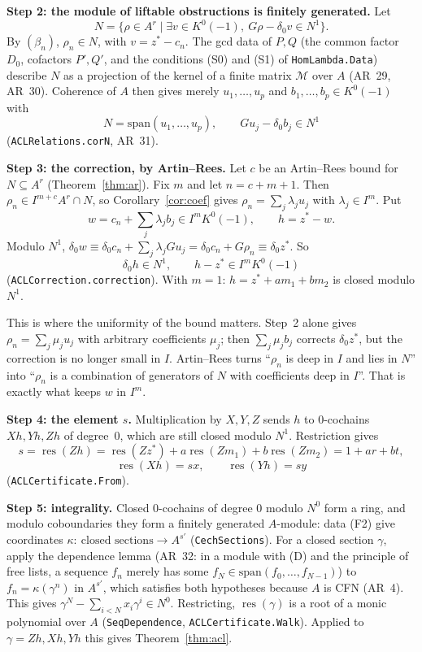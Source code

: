 \documentclass[11pt]{amsart}
\theoremstyle{definition}
\theoremstyle{remark}
\DeclareMathOperator{\res}{res}
\newcommand{\sm}{\mathrm{span}}
\begin{document}
\medskip\noindent\textbf{Step 2: the module of liftable obstructions is
finitely generated.} Let
\[
 N=\{\rho\in A^r\mid \exists v\in K^0(-1),\ G\rho-\delta_0v\in N^1\}.
\]
By $(\beta_n)$, $\rho_n\in N$, with $v=z^*-c_n$. The gcd data of $P,Q$
(the common factor $D_0$, cofactors $P',Q'$, and the conditions (S0) and
(S1) of \texttt{HomLambda.Data}) describe $N$ as a projection of the
kernel of a finite matrix $\mathcal M$ over $A$ (AR~29, AR~30). Coherence of $A$ then gives merely
$u_1,\dots,u_p$ and $b_1,\dots,b_p\in K^0(-1)$ with
\[
 N=\sm(u_1,\dots,u_p),\qquad Gu_j-\delta_0b_j\in N^1
\]
(\texttt{ACLRelations.corN}, AR~31).

\medskip\noindent\textbf{Step 3: the correction, by Artin--Rees.}
Let $c$ be an Artin--Rees bound for $N\subseteq A^r$
(Theorem~\ref{thm:ar}). Fix $m$ and let $n=c+m+1$. Then
$\rho_n\in I^{m+c}A^r\cap N$, so Corollary~\ref{cor:coef} gives
$\rho_n=\sum_j\lambda_ju_j$ with $\lambda_j\in I^m$. Put
\[
 w=c_n+\sum_j\lambda_jb_j\in I^mK^0(-1),\qquad h=z^*-w.
\]
Modulo $N^1$,
$\delta_0w\equiv\delta_0c_n+\sum_j\lambda_jGu_j=\delta_0c_n+G\rho_n\equiv\delta_0z^*$.
So
\[
 \delta_0h\in N^1,\qquad h-z^*\in I^mK^0(-1)
\]
(\texttt{ACLCorrection.correction}). With $m=1$:
$h=z^*+am_1+bm_2$ is closed modulo $N^1$.

This is where the uniformity of the bound matters. Step~2 alone gives
$\rho_n=\sum_j\mu_ju_j$ with arbitrary coefficients $\mu_j$; then
$\sum_j\mu_jb_j$ corrects $\delta_0z^*$, but the correction is no longer
small in $I$. Artin--Rees turns ``$\rho_n$ is deep in $I$ and lies in
$N$'' into ``$\rho_n$ is a combination of generators of $N$ with
coefficients deep in $I$''. That is exactly what keeps $w$ in $I^m$.

\medskip\noindent\textbf{Step 4: the element $s$.} Multiplication by
$X,Y,Z$ sends $h$ to $0$-cochains $Xh,Yh,Zh$ of degree~$0$, which are
still closed modulo $N^1$. Restriction gives
\[
 s=\res(Zh)=\res(Zz^*)+a\res(Zm_1)+b\res(Zm_2)=1+ar+bt,
\]
\[
 \res(Xh)=sx,\qquad \res(Yh)=sy
\]
(\texttt{ACLCertificate.From}).

\medskip\noindent\textbf{Step 5: integrality.} Closed $0$-cochains of
degree $0$ modulo $N^0$ form a ring, and modulo coboundaries they form a
finitely generated $A$-module: data (F2) give coordinates
$\kappa:\ \text{closed sections}\to A^{s'}$ (\texttt{CechSections}). For
a closed section $\gamma$, apply the dependence lemma (AR~32:
in a module with (D) and the principle of free lists, a sequence $f_n$
merely has some $f_N\in\sm(f_0,\dots,f_{N-1})$) to $f_n=\kappa(\gamma^n)$
in $A^{s'}$, which satisfies both hypotheses because $A$ is CFN (AR~4).
This gives $\gamma^N-\sum_{i<N}x_i\gamma^i\in N^0$. Restricting,
$\res(\gamma)$ is a root of a monic polynomial over $A$
(\texttt{SeqDependence}, \texttt{ACLCertificate.Walk}). Applied to
$\gamma=Zh,Xh,Yh$ this gives Theorem~\ref{thm:acl}.
\end{document}
